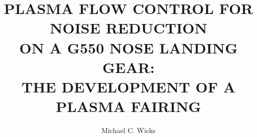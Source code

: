 \documentclass[final,numrefs,sort&compress,noinfo]{nddiss2e}
\begin{document}
\frontmatter %

\title{PLASMA FLOW CONTROL FOR NOISE REDUCTION \\ ON A G550 NOSE LANDING GEAR: \\ THE DEVELOPMENT OF A PLASMA FAIRING}
\author{Michael C. Wicks}

\maketitle
%
%

\makecopyright
\end{document}

